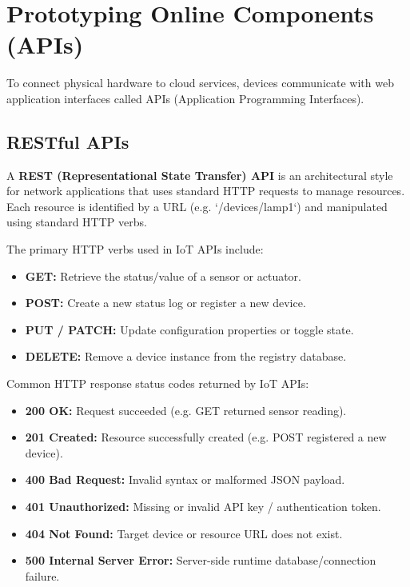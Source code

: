 \documentclass[12pt,a4paper]{article}
\begin{document}
\section{Prototyping Online Components (APIs)}

To connect physical hardware to cloud services, devices communicate with web application interfaces called APIs (Application Programming Interfaces).

\subsection{RESTful APIs}
\begin{tcolorbox}[defbox, title={REST API}]
  A \textbf{REST (Representational State Transfer) API} is an architectural style for network applications that uses standard HTTP requests to manage resources. Each resource is identified by a URL (e.g. `/devices/lamp1`) and manipulated using standard HTTP verbs.
\end{tcolorbox}
The primary HTTP verbs used in IoT APIs include:
\begin{itemize}[leftmargin=*, itemsep=2pt]
  \item \textbf{GET:} Retrieve the status/value of a sensor or actuator.
  \item \textbf{POST:} Create a new status log or register a new device.
  \item \textbf{PUT / PATCH:} Update configuration properties or toggle state.
  \item \textbf{DELETE:} Remove a device instance from the registry database.
\end{itemize}

Common HTTP response status codes returned by IoT APIs:
\begin{itemize}[leftmargin=*, itemsep=2.5pt]
  \item \textbf{200 OK:} Request succeeded (e.g. GET returned sensor reading).
  \item \textbf{201 Created:} Resource successfully created (e.g. POST registered a new device).
  \item \textbf{400 Bad Request:} Invalid syntax or malformed JSON payload.
  \item \textbf{401 Unauthorized:} Missing or invalid API key / authentication token.
  \item \textbf{404 Not Found:} Target device or resource URL does not exist.
  \item \textbf{500 Internal Server Error:} Server-side runtime database/connection failure.
\end{itemize}
\end{document}
